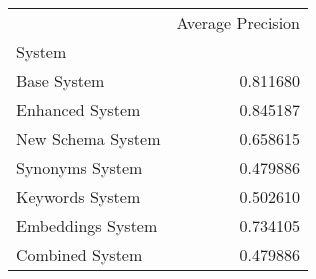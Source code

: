\begin{tabular}{lr}
\toprule
 & Average Precision \\
System &  \\
\midrule
Base System & 0.811680 \\
Enhanced System & 0.845187 \\
New Schema System & 0.658615 \\
Synonyms System & 0.479886 \\
Keywords System & 0.502610 \\
Embeddings System & 0.734105 \\
Combined System & 0.479886 \\
\bottomrule
\end{tabular}

